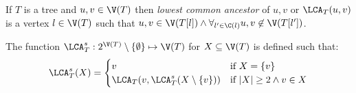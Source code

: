 \begin{defi}
    If $T$ is a tree and $u,v \in \V(T)$ then \emph{lowest common ancestor} of $u, v$ or $\LCA_T(u,v)$ is a vertex $l \in \V(T)$ such that $u,v \in \V(T[l]) \land \forall_{l' \in \C(l)} u,v \not\in \V(T[l'])$.
\end{defi}

\begin{defi}
    The function $\LCA_T^s : 2^{\V(T)} \setminus \{ \emptyset \} \mapsto \V(T)$ for $X \subseteq \V(T)$ is defined such that:
    \[
        \LCA_T^s(X) = \begin{cases}
            v                                      & \text{if } X = \{v\}                \\
            \LCA_T(v, \LCA_T^s(X \setminus \{v\})) & \text{if } |X| \geq 2 \land v \in X \\
        \end{cases}
    \]
\end{defi}
